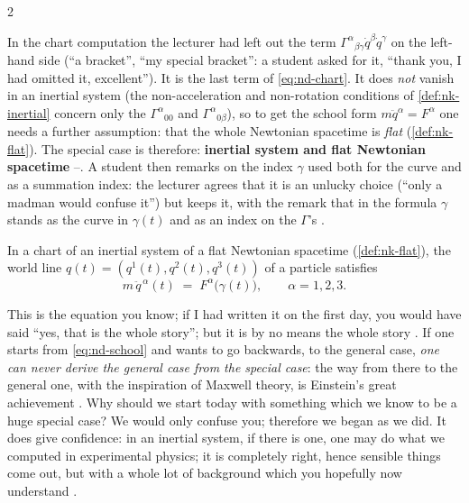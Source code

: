 \begin{paracol}{2}
\begin{coursenote}\label{cn:nd-missing}
In the chart computation the lecturer had left out the term $\Gamma^\alpha{}_{\beta\gamma}\dot q^\beta\dot q^\gamma$ on the left-hand side (``a bracket'', ``my special bracket'': a student asked for it, ``thank you, I had omitted it, excellent''). It is the last term of \eqref{eq:nd-chart}.
It does \emph{not} vanish in an inertial system (the non-acceleration and non-rotation conditions of \cref{def:nk-inertial} concern only the $\Gamma^\alpha{}_{00}$ and $\Gamma^\alpha{}_{0\beta}$), so to get the school form $m\ddot q^\alpha=F^\alpha$ one needs a further assumption: that the whole Newtonian spacetime
is \emph{flat} (\cref{def:nk-flat}). The special case is therefore: \textbf{inertial system and flat Newtonian spacetime} --. A student then remarks on the index $\gamma$ used both for the curve and as a summation index: the lecturer agrees that it is an unlucky choice
(``only a madman would confuse it'') but keeps it, with the remark that in the formula $\gamma$ stands as the curve in $\gamma(t)$ and as an index on the $\Gamma$'s .
\end{coursenote}
\begin{theorem}\label{thm:nd-school}
In a chart of an inertial system of a flat Newtonian spacetime (\cref{def:nk-flat}), the world line $q(t)=(q^1(t),q^2(t),q^3(t))$ of a particle satisfies
\begin{equation}\label{eq:nd-school}
  m\,\ddot q^{\,\alpha}(t)\;=\;F^\alpha\bigl(\gamma(t)\bigr),\qquad\alpha=1,2,3 .
\end{equation}
\end{theorem}
This is the equation you know; if I had written it on the first day, you would have said ``yes, that is the whole story''; but it is by no means the whole story . If one starts from \eqref{eq:nd-school} and wants to go backwards, to the general case, \emph{one can never derive the general case from the special case}:
the way from there to the general one, with the inspiration of Maxwell theory, is Einstein's great achievement . Why should we start today with something which we know to be a huge special case? We would only confuse you; therefore we began as we did. It does give confidence: in an inertial system,
if there is one, one may do what we computed in experimental physics; it is completely right, hence sensible things come out, but with a whole lot of background which you hopefully now understand .


\end{paracol}
